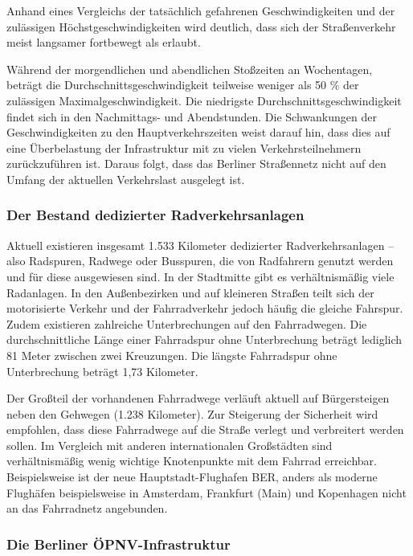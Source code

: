 Anhand eines Vergleichs der tatsächlich gefahrenen Geschwindigkeiten und der zulässigen Höchstgeschwindigkeiten wird deutlich, dass sich der Straßenverkehr meist langsamer fortbewegt als erlaubt.

Während der morgendlichen und abendlichen Stoßzeiten an Wochentagen, beträgt die Durchschnittsgeschwindigkeit teilweise weniger als 50 \% der zulässigen Maximalgeschwindigkeit. Die niedrigste Durchschnittsgeschwindigkeit findet sich in den Nachmittags- und Abendstunden. Die Schwankungen der Geschwindigkeiten zu den Hauptverkehrszeiten weist darauf hin, dass dies auf eine Überbelastung der Infrastruktur mit zu vielen Verkehrsteilnehmern zurückzuführen ist.
Daraus folgt, dass das Berliner Straßennetz nicht auf den Umfang der aktuellen Verkehrslast ausgelegt ist.


\subsubsection{Der Bestand dedizierter Radverkehrsanlagen}

Aktuell existieren insgesamt 1.533 Kilometer dedizierter Radverkehrsanlagen – also Radspuren, Radwege oder Busspuren, die von Radfahrern genutzt werden und für diese ausgewiesen sind. In der Stadtmitte gibt es verhältnismäßig viele Radanlagen.%
In den Außenbezirken und auf kleineren Straßen teilt sich der motorisierte Verkehr und der Fahrradverkehr jedoch häufig die gleiche Fahrspur. Zudem existieren zahlreiche Unterbrechungen auf den Fahrradwegen. Die durchschnittliche Länge einer Fahrradspur ohne Unterbrechung beträgt lediglich 81 Meter zwischen zwei Kreuzungen. Die längste Fahrradspur ohne Unterbrechung beträgt 1,73 Kilometer.

Der Großteil der vorhandenen Fahrradwege verläuft aktuell auf Bürgersteigen neben den Gehwegen (1.238 Kilometer). Zur Steigerung der Sicherheit wird empfohlen, dass diese Fahrradwege auf die Straße verlegt und verbreitert werden sollen.
Im Vergleich mit anderen internationalen Großstädten sind verhältnismäßig wenig wichtige Knotenpunkte mit dem Fahrrad erreichbar. Beispielsweise ist der neue Hauptstadt-Flughafen BER, anders als moderne Flughäfen beispielsweise in Amsterdam, Frankfurt (Main) und Kopenhagen nicht an das Fahrradnetz angebunden.

\subsubsection{Die Berliner ÖPNV-Infrastruktur}

